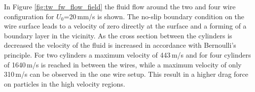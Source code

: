 In Figure \ref{fig:tw_fw_flow_field} the fluid flow around the two and four wire configuration for $U_{0}$=20\,mm/s is shown. The no-slip boundary condition on the wire surface leads to a velocity of zero directly at the surface and a forming of a boundary layer in the vicinity. As the cross section between the cylinders is decreased the velocity of the fluid is increased in accordance with Bernoulli's principle. For two cylinders a maximum velocity of 443\,\textmu m/s and for four cylinders of 1640\,\textmu m/s is reached in between the wires, while a maximum velocity of only 310\,\textmu m/s can be observed in the one wire setup. This result in a higher drag force on particles in the high velocity regions.   
  
\begin{figure}
            \begin{subfigure}{0.49\textwidth}
                  \flushleft
          \end{subfigure}\hfill
        \begin{subfigure}{0.49\textwidth}
                \flushright

\end{subfigure}
\end{figure}

